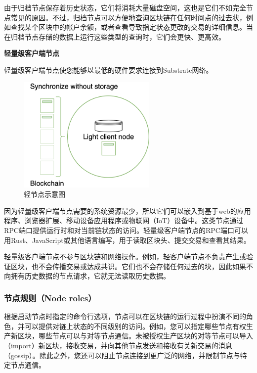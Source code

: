 由于归档节点保存着历史状态，它们将消耗大量磁盘空间，这也是它们不如完全节点常见的原因。不过，归档节点可以方便地查询区块链在任何时间点的过去状，例如查找某个区块中的帐户余额，或者查看导致指定状态更改的交易的详细信息。当在归档节点存储的数据上运行这些类型的查询时，它们会更快、更高效。

\hypertarget{ux8f7bux91cfux7ea7ux5ba2ux6237ux7aefux8282ux70b9}{%
\textbf{轻量级客户端节点}\label{ux8f7bux91cfux7ea7ux5ba2ux6237ux7aefux8282ux70b9}}

轻量级客户端节点使您能够以最低的硬件要求连接到Substrate网络。

\begin{figure}[htbp]
  \centering
  \includegraphics[width=0.6\textwidth]{images/light-node.png}
  \caption{轻节点示意图}\label{轻节点示意图} %
\end{figure}

因为轻量级客户端节点需要的系统资源最少，所以它们可以嵌入到基于web的应用程序、浏览器扩展、移动设备应用程序或物联网（IoT）设备中。这类节点通过RPC端口提供运行时和对当前链状态的访问。轻量级客户端节点的RPC端口可以用Rust、JavaScript或其他语言编写，用于读取区块头、提交交易和查看其结果。

轻量级客户端节点不参与区块链和网络操作。例如，轻客户端节点不负责产生或验证区块，也不会传播交易或达成共识。它们也不会存储任何过去的块，因此如果不向拥有历史数据的节点请求，它就无法读取历史数据。

\hypertarget{ux8282ux70b9ux89c4ux5219node-rolesuxff09}{%
\subsubsection{节点规则（Node
roles）}\label{ux8282ux70b9ux89c4ux5219node-rolesuxff09}}

根据启动节点时指定的命令行选项，节点可以在区块链的运行过程中扮演不同的角色，并可以提供对链上状态的不同级别的访问。例如，您可以指定哪些节点有权生产新区块，哪些节点可以与对等节点通信。未被授权生产区块的对等节点可以导入（import）新区块，接收交易，并向其他节点发送和接收有关新交易的消息（gossip）。除此之外，您还可以阻止节点连接到更广泛的网络，并限制节点与特定节点通信。

